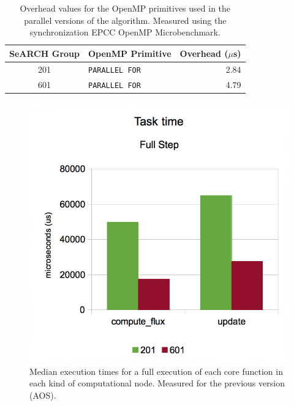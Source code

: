 \documentclass[abstract=on,9pt,twocolumn]{scrartcl}
\begin{document}
\begin{table}[!htp]
	\begin{center}
		\begin{tabular}{|c|l|r|}
		\hline
		SeARCH Group & OpenMP Primitive & Overhead ($\mu$s)	\\
		\hline
		201 & \texttt{PARALLEL FOR} & 2.84	\\
		601 & \texttt{PARALLEL FOR} & 4.79	\\
		\hline
		\end{tabular}
	\end{center}
	\caption{Overhead values for the OpenMP primitives used in the parallel versions of the algorithm. Measured using the synchronization EPCC OpenMP Microbenchmark.}
	\label{tab:overhead}
\end{table}

\begin{figure}[!p]
	\begin{center}
		\includegraphics[width=\columnwidth]{images/report.april/steptimeAOS.png}
	\end{center}
	\caption{Median execution times for a full execution of each core function in each kind of computational node. Measured for the previous version (AOS).}
	\label{fig:steptimeAOS}
\end{figure}
\end{document}
